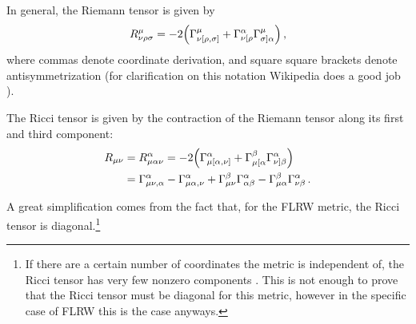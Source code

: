 \documentclass[main.tex]{subfiles}
\begin{document}
In general, the Riemann tensor is given by 
%
\begin{align}
R^{\mu }_{\nu \rho \sigma } = -2 \qty(\Gamma^{\mu }_{\nu [\rho , \sigma ]} + \Gamma^{\alpha }_{\nu [\rho } \Gamma^{\mu }_{\sigma ] \alpha })
\,,
\end{align}
%
where commas denote coordinate derivation, and square square brackets denote antisymmetrization (for clarification on this notation Wikipedia does a good job \cite{AntisymmetricTensor2019}). 

The Ricci tensor is given by the contraction of the Riemann tensor along its first and third component:
%
\begin{align}
R_{\mu \nu } 
&= R^{\alpha }_{\mu \alpha \nu }
= -2 \qty(\Gamma^{\alpha }_{\mu [\alpha , \nu ]} + \Gamma^{\beta }_{\mu [\alpha } \Gamma^{\alpha }_{\nu ] \beta  })  \\
&= \Gamma^{\alpha }_{\mu \nu , \alpha } 
- \Gamma^{\alpha }_{\mu \alpha , \nu }
+ \Gamma^{\beta }_{\mu \nu } \Gamma^{\alpha }_{\alpha \beta } 
- \Gamma^{\beta}_{\mu \alpha } \Gamma^{\alpha }_{\nu \beta }
\,.
\end{align}

A great simplification comes from the fact that, for the FLRW metric, the Ricci tensor is diagonal.\footnote{If there are a certain number of coordinates the metric is independent of, the Ricci tensor has very few nonzero components \cite{winRicciTensorDiagonal1996}. This is not enough to prove that the Ricci tensor must be diagonal for this metric, however in the specific case of FLRW this is the case anyways.}
\end{document}
